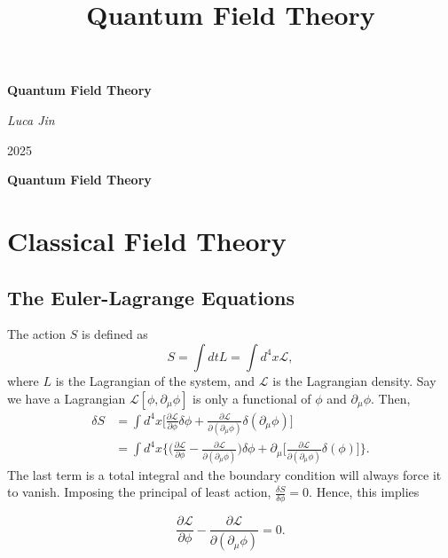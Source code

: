\documentclass[11pt]{article}
\theoremstyle{definition}
\begin{document}
\title{Quantum Field Theory}


\thispagestyle{empty}

\begin{titlepage}
\centering



\vspace*{3cm} %

{\fontsize{38}{46}\selectfont\bfseries Quantum Field Theory}

\vspace{1.5cm} %

{\Large \itshape Luca Jin}

\vspace{0.5cm} %

{\large 2025}

\vfill %



\end{titlepage}

\tableofcontents
\newpage

{\LARGE \bf Quantum Field Theory}


\section{Classical Field Theory}
\subsection{The Euler-Lagrange Equations}
The action $S$ is defined as 
\begin{equation}
    S = \int dt L = \int d^4x \mathcal{L},
\end{equation}
where $L$ is the Lagrangian of the system, and $\mathcal{L}$ is the Lagrangian density. Say we have a Lagrangian $\mathcal{L}[\phi, \partial_\mu\phi]$ is only a functional of $\phi$ and $\partial_\mu\phi$. Then,
\begin{equation}
    \begin{aligned}
        \delta S &= \int d^4x \biggr [ \frac{\partial\mathcal{L}}{\partial \phi}\delta\phi + \frac{\partial\mathcal{L}}{\partial(\partial_\mu\phi)}\delta(\partial_\mu\phi)\biggr] \\
        & = \int d^4x\biggr\{  \biggr(\frac{\partial\mathcal{L}}{\partial \phi} - \frac{\partial\mathcal{L}}{\partial(\partial_\mu\phi)}\biggr)\delta\phi  + \partial_\mu\biggr[\frac{\partial\mathcal{L}}{\partial(\partial_\mu\phi)}\delta(\phi)\biggr] \biggr\}.
        \label{Eq. EL derivation}
    \end{aligned}
\end{equation}
The last term is a total integral and the boundary condition will always force it to vanish. Imposing the principal of least action, $\frac{\delta S}{\delta\phi} =0$. Hence, this implies
\begin{shaded}
    \begin{equation}
        \frac{\partial\mathcal{L}}{\partial \phi} - \frac{\partial\mathcal{L}}{\partial(\partial_\mu\phi)} = 0.
    \end{equation}
\end{shaded}
\end{document}
